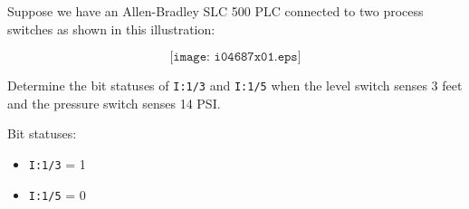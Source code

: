

Suppose we have an Allen-Bradley SLC 500 PLC connected to two process switches as shown in this illustration:

$$\texttt{[image: i04687x01.eps]}$$

Determine the bit statuses of {\tt I:1/3} and {\tt I:1/5} when the level switch senses 3 feet and the pressure switch senses 14 PSI.







Bit statuses:

\begin{itemize}
\item{} {\tt I:1/3} = 1
\item{} {\tt I:1/5} = 0
\end{itemize}











